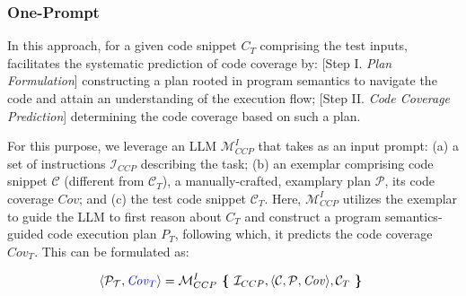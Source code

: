 \subsubsection{One-Prompt {\cctool}}
In this approach, for a given code snippet $C_T$ comprising the test inputs, {\cctool} facilitates the systematic prediction of code coverage by: [Step I. \textit{Plan Formulation}] constructing a plan rooted in program semantics to navigate the code and attain an understanding of the execution flow; [Step II. \textit{Code Coverage Prediction}] determining the code coverage based on such a plan. 

For this purpose, we leverage an LLM $\mathcal{M}_{CCP}^{I}$ that takes as an input prompt: (a) a set of instructions $\mathcal{I}_{CCP}$ describing the task; (b) an exemplar comprising code snippet $\mathcal{C}$ (different from $\mathcal{C}_T$), a manually-crafted, examplary plan $\mathcal{P}$, 
its code coverage $\mathit{Cov}$; and (c) the test code snippet $\mathcal{C}_T$.
Here, $\mathcal{M}_{CCP}^{I}$ utilizes the exemplar to guide the LLM to first reason about $C_T$ and construct a program semantics-guided code execution plan $P_T$, following which, it predicts the code coverage $\mathit{Cov}_T$.
This can be formulated as:

\begin{equation}
\langle \mathcal{P_T}, \textcolor{blue}{\mathit{Cov}_{T}} \rangle = \mathcal{M}_{CCP}^{I} \textbf{\ \{\ } \mathcal{I}_{CCP}, \langle \mathcal{C}, \mathcal{P}, \mathit{Cov} \rangle, \mathcal{C}_T \textbf{\ \}\ }  
\end{equation}





